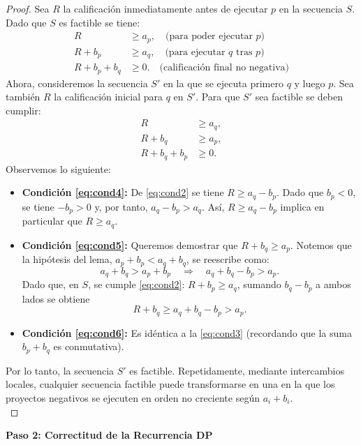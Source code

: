 ﻿\documentclass{article}
\theoremstyle{plain}
\theoremstyle{definition}
\begin{document}
\begin{proof}
Sea \(R\) la calificación inmediatamente antes de ejecutar \(p\) en la secuencia \(S\). Dado que \(S\) es factible se tiene:
\begin{align}
R &\ge a_p, \quad \text{(para poder ejecutar }p\text{)} \label{eq:cond1}\\[1mm]
R+b_p &\ge a_q, \quad \text{(para ejecutar }q\text{ tras }p\text{)} \label{eq:cond2}\\[1mm]
R+b_p+b_q &\ge 0. \quad \text{(calificación final no negativa)} \label{eq:cond3}
\end{align}
Ahora, consideremos la secuencia \(S'\) en la que se ejecuta primero \(q\) y luego \(p\). Sea también \(R\) la calificación inicial para \(q\) en \(S'\). Para que \(S'\) sea factible se deben cumplir:
\begin{align}
R &\ge a_q, \label{eq:cond4}\\[1mm]
R+b_q &\ge a_p, \label{eq:cond5}\\[1mm]
R+b_q+b_p &\ge 0. \label{eq:cond6}
\end{align}
Observemos lo siguiente:
\begin{itemize}
    \item \textbf{Condición \eqref{eq:cond4}:} De \eqref{eq:cond2} se tiene \(R \ge a_q - b_p\). Dado que \(b_p<0\), se tiene \(-b_p>0\) y, por tanto, \(a_q - b_p > a_q\). Así, \(R \ge a_q - b_p\) implica en particular que \(R \ge a_q\).
    \item \textbf{Condición \eqref{eq:cond5}:} Queremos demostrar que \(R+b_q \ge a_p\). Notemos que la hipótesis del lema, \(a_p+b_p < a_q+b_q\), se reescribe como:
    \[
    a_q+b_q > a_p+b_p \quad \Longrightarrow \quad a_q+b_q-b_p > a_p.
    \]
    Dado que, en \(S\), se cumple \eqref{eq:cond2}: \(R+b_p \ge a_q\), sumando \(b_q-b_p\) a ambos lados se obtiene
    \[
    R+b_q \ge a_q+b_q-b_p > a_p.
    \]
    \item \textbf{Condición \eqref{eq:cond6}:} Es idéntica a la \eqref{eq:cond3} (recordando que la suma \(b_p+b_q\) es conmutativa).
\end{itemize}
Por lo tanto, la secuencia \(S'\) es factible. Repetidamente, mediante intercambios locales, cualquier secuencia factible puede transformarse en una en la que los proyectos negativos se ejecuten en orden no creciente según \(a_i+b_i\).
\\
\end{proof}

\textbf{Paso 2: Correctitud de la Recurrencia DP}
\end{document}
